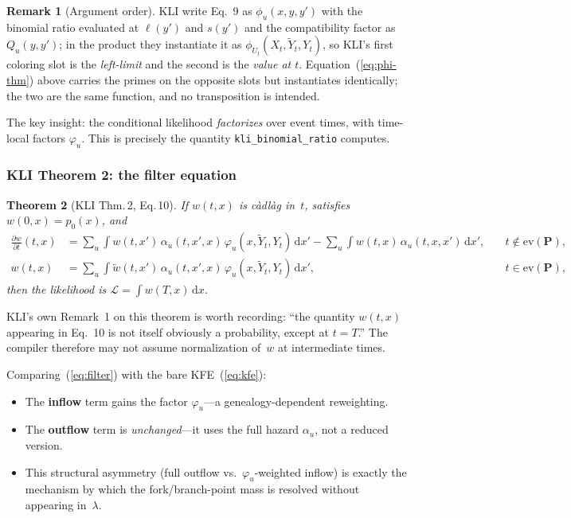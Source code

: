 \documentclass[11pt,leqno]{article}
\renewcommand{\Pr}{\mathbf{P}}      %
\newcommand{\dd}[1]{\,\mathrm{d}{#1}}
\newcommand{\lik}{\mathcal{L}}      %
\newcommand{\code}[1]{\texttt{#1}}
\theoremstyle{plain}
\newtheorem{theorem}{Theorem}
\theoremstyle{definition}
\newtheorem{remark}[theorem]{Remark}
\begin{document}
\begin{remark}[Argument order]
KLI write Eq.~9 as $\phi_u(x, y, y')$ with the binomial ratio
evaluated at $\ell(y')$ and $s(y')$ and the compatibility factor as
$Q_u(y,y')$; in the product they instantiate it as
$\phi_{U_t}(X_t, \tilde{Y}_t, Y_t)$, so KLI's first coloring slot is
the \emph{left-limit} and the second is the \emph{value at $t$}.
Equation~(\ref{eq:phi-thm}) above carries the primes on the opposite
slots but instantiates identically; the two are the same function, and
no transposition is intended.
\end{remark}

The key insight: the conditional likelihood \emph{factorizes} over
event times, with time-local factors $\varphi_u$.  This is precisely
the quantity \code{kli\_binomial\_ratio} computes.

\subsubsection{KLI Theorem 2: the filter equation}

\begin{theorem}[KLI Thm.\,2, Eq.\,10]
If $w(t,x)$ is c\`adl\`ag in~$t$, satisfies $w(0,x) = p_0(x)$, and
\begin{equation}\label{eq:filter}
  \begin{aligned}
    \frac{\partial w}{\partial t}(t,x) &=
      \sum_u \int w(t,x')\,\alpha_u(t,x',x)\,
        \varphi_u(x, \tilde{Y}_t, Y_t) \dd{x'}
      - \sum_u \int w(t,x)\,\alpha_u(t,x,x') \dd{x'},
      &\quad t \notin \mathrm{ev}(\Pr), \\
    w(t,x) &= \sum_u \int \tilde{w}(t,x')\,
      \alpha_u(t,x',x)\,\varphi_u(x, \tilde{Y}_t, Y_t) \dd{x'},
      &\quad t \in \mathrm{ev}(\Pr),
  \end{aligned}
\end{equation}
then the likelihood is $\lik = \int w(T,x)\dd{x}$.
\end{theorem}

KLI's own Remark~1 on this theorem is worth recording: ``the quantity
$w(t,x)$ appearing in Eq.~10 is not itself obviously a probability,
except at $t = T$.''  The compiler therefore may not assume
normalization of~$w$ at intermediate times.

Comparing~(\ref{eq:filter}) with the bare KFE~(\ref{eq:kfe}):
\begin{itemize}
  \item The \textbf{inflow} term gains the factor $\varphi_u$---a
    genealogy-dependent reweighting.
  \item The \textbf{outflow} term is \emph{unchanged}---it uses the
    full hazard $\alpha_u$, not a reduced version.
  \item This structural asymmetry (full outflow vs.\ $\varphi_u$-weighted
    inflow) is exactly the mechanism by which the fork/branch-point mass
    is resolved without appearing in~$\lambda$.
\end{itemize}
\end{document}
